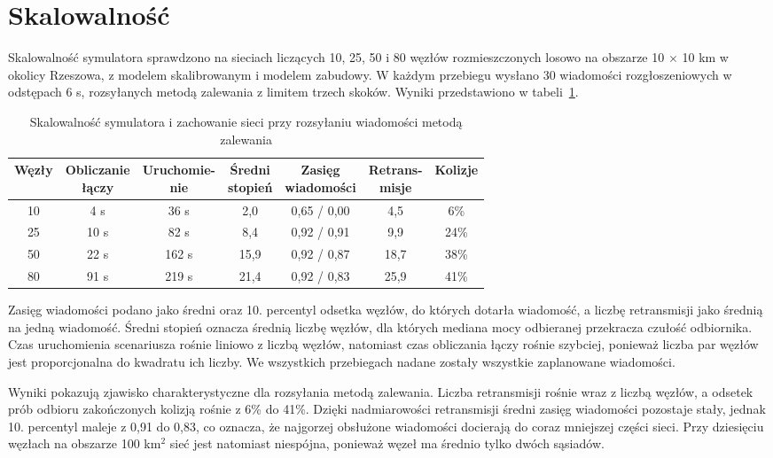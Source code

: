 \section{Skalowalność}

Skalowalność symulatora sprawdzono na sieciach liczących 10, 25, 50 i 80 węzłów rozmieszczonych losowo na obszarze 10 \(\times\) 10 km w okolicy Rzeszowa, z modelem skalibrowanym i modelem zabudowy. W każdym przebiegu wysłano 30 wiadomości rozgłoszeniowych w odstępach 6 s, rozsyłanych metodą zalewania z limitem trzech skoków. Wyniki przedstawiono w tabeli~\ref{tab:skalowalnosc}.

\begin{table}[ht]
\centering
\caption{Skalowalność symulatora i zachowanie sieci przy rozsyłaniu wiadomości metodą zalewania}
\label{tab:skalowalnosc}
\small
\begin{tabular}{|c|c|c|c|c|c|c|}
\hline
\textbf{Węzły} & \shortstack{\textbf{Obliczanie}\\\textbf{łączy}} & \shortstack{\textbf{Uruchomie-}\\\textbf{nie}} & \shortstack{\textbf{Średni}\\\textbf{stopień}} & \shortstack{\textbf{Zasięg}\\\textbf{wiadomości}} & \shortstack{\textbf{Retrans-}\\\textbf{misje}} & \textbf{Kolizje} \\
\hline
10 & 4 s & 36 s & 2,0 & 0,65 / 0,00 & 4,5 & 6\% \\
25 & 10 s & 82 s & 8,4 & 0,92 / 0,91 & 9,9 & 24\% \\
50 & 22 s & 162 s & 15,9 & 0,92 / 0,87 & 18,7 & 38\% \\
80 & 91 s & 219 s & 21,4 & 0,92 / 0,83 & 25,9 & 41\% \\
\hline
\end{tabular}
\end{table}

Zasięg wiadomości podano jako średni oraz 10. percentyl odsetka węzłów, do których dotarła wiadomość, a liczbę retransmisji jako średnią na jedną wiadomość. Średni stopień oznacza średnią liczbę węzłów, dla których mediana mocy odbieranej przekracza czułość odbiornika. Czas uruchomienia scenariusza rośnie liniowo z liczbą węzłów, natomiast czas obliczania łączy rośnie szybciej, ponieważ liczba par węzłów jest proporcjonalna do kwadratu ich liczby. We wszystkich przebiegach nadane zostały wszystkie zaplanowane wiadomości.

Wyniki pokazują zjawisko charakterystyczne dla rozsyłania metodą zalewania. Liczba retransmisji rośnie wraz z liczbą węzłów, a odsetek prób odbioru zakończonych kolizją rośnie z 6\% do 41\%. Dzięki nadmiarowości retransmisji średni zasięg wiadomości pozostaje stały, jednak 10. percentyl maleje z 0,91 do 0,83, co oznacza, że najgorzej obsłużone wiadomości docierają do coraz mniejszej części sieci. Przy dziesięciu węzłach na obszarze 100 km\(^2\) sieć jest natomiast niespójna, ponieważ węzeł ma średnio tylko dwóch sąsiadów.


